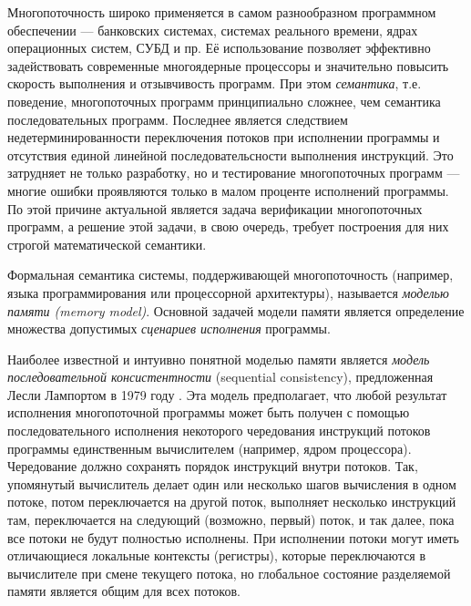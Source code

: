 
{\actuality} 
Многопоточность широко применяется в самом разнообразном программном обеспечении ---
банковских системах, системах реального времени, ядрах операционных систем, СУБД и пр.
Её использование позволяет эффективно задействовать современные многоядерные процессоры и
значительно повысить скорость выполнения и отзывчивость программ.
При этом \emph{семантика}, т.е. поведение, многопоточных программ принципиально сложнее,
чем семантика последовательных программ.
Последнее является следствием недетерминированности переключения потоков при исполнении
программы и отсутствия единой линейной последовательсности выполнения инструкций.
Это затрудняет не только разработку, но и тестирование многопоточных программ 
--- многие ошибки проявляются только в малом проценте исполнений программы.
По этой причине актуальной является задача верификации многопоточных программ, а
решение этой задачи, в свою очередь, требует построения  для них 
строгой математической  семантики.

Формальная семантика системы, поддерживающей многопоточность (например, языка программирования или процессорной архитектуры),
называется \emph{моделью памяти (memory model)}. 
Основной задачей модели памяти является определение множества 
допустимых \emph{сценариев исполнения} программы.

Наиболее известной и интуивно понятной моделью памяти является \emph{модель последовательной консистентности} (sequential consistency),
предложенная Лесли Лампортом в 1979 году \cite{Lamport:TC79}.
Эта модель предполагает, что любой результат исполнения многопоточной программы может быть
получен с помощью последовательного исполнения некоторого чередования инструкций потоков программы
единственным вычислителем (например, ядром процессора).
Чередование должно сохранять порядок инструкций внутри потоков.
Так, упомянутый вычислитель делает один или несколько шагов вычисления в одном потоке, потом переключается на другой поток,
выполняет несколько инструкций там, переключается на следующий (возможно, первый) поток, и так далее, пока
все потоки не будут полностью исполнены. При исполнении потоки могут иметь отличающиеся локальные контексты (регистры),
которые переключаются в вычислителе при смене текущего потока, но глобальное состояние разделяемой памяти является общим для всех
потоков.

